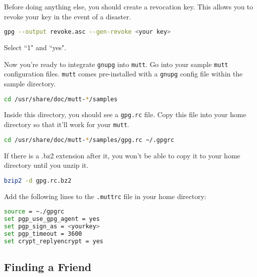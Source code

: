 \documentclass[11pt,a4paper]{article}
\begin{document}
Before doing anything else, you should create a revocation key. This allows you to revoke your key in the event of a disaster. 

\begin{lstlisting}[basicstyle=\ttfamily, backgroundcolor = \color{lightgray}, language = bash, xleftmargin = 0cm, framexleftmargin = 1em]
gpg --output revoke.asc --gen-revoke <your key>
\end{lstlisting}

Select ``1" and ``yes". 

Now you're ready to integrate \verb|gnupg| into \verb|mutt|. Go into your sample \verb|mutt| configuration files. \verb|mutt| comes pre-installed with a \verb|gnupg| config file within the sample directory.  

\begin{lstlisting}[basicstyle=\ttfamily, backgroundcolor = \color{lightgray}, language = bash, xleftmargin = 0cm, framexleftmargin = 1em]
cd /usr/share/doc/mutt-*/samples
\end{lstlisting}

Inside this directory, you should see a \verb|gpg.rc| file. Copy this file into your home directory so that it'll work for your \verb|mutt|. 

\begin{lstlisting}[basicstyle=\ttfamily, backgroundcolor = \color{lightgray}, language = bash, xleftmargin = 0cm, framexleftmargin = 1em]
cd /usr/share/doc/mutt-*/samples/gpg.rc ~/.gpgrc
\end{lstlisting}

If there is a .bz2 extension after it, you won't be able to copy it to your home directory until you unzip it.

\begin{lstlisting}[basicstyle=\ttfamily, backgroundcolor = \color{lightgray}, language = bash, xleftmargin = 0cm, framexleftmargin = 1em]
bzip2 -d gpg.rc.bz2
\end{lstlisting}

Add the following lines to the \verb|.muttrc| file in your home directory:

\begin{lstlisting}[basicstyle=\ttfamily, backgroundcolor = \color{lightgray}, language = bash, xleftmargin = 0cm, framexleftmargin = 1em]
source = ~./gpgrc
set pgp_use_gpg_agent = yes
set pgp_sign_as = <yourkey> 
set pgp_timeout = 3600
set crypt_replyencrypt = yes
\end{lstlisting}

\subsection*{Finding a Friend}
\end{document}
